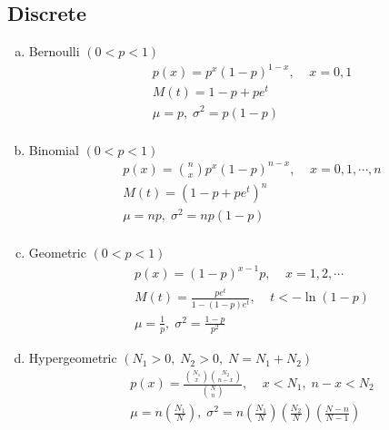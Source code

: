 \documentclass{article}
\begin{document}
    \subsection{Discrete}
        \begin{enumerate}[(a)]
            \item Bernoulli $(0 < p < 1)$
            $$
            \begin{aligned}
                & p(x) = p^x(1 - p)^{1 - x}, \;\;\;\; x = 0, 1 \\
                & M(t) = 1 - p + pe^t \\
                & \mu = p, \; \sigma^2 = p(1 - p) \\
            \end{aligned}
            $$
            
            \item Binomial $(0 < p < 1)$
            $$
            \begin{aligned}
                & p(x) = \binom{n}{x} p^x(1 - p)^{n - x}, \;\;\;\; x = 0, 1, \cdots, n \\
                & M(t) = (1 - p + pe^t )^n \\
                & \mu = np, \; \sigma^2 = np(1 - p) \\
            \end{aligned}
            $$
            
            \item Geometric $(0 < p < 1)$
            $$
            \begin{aligned}
                & p(x) = (1 - p)^{x - 1}p, \;\;\;\; x = 1, 2, \cdots \\
                & M(t) = \frac{pe^t}{1 - (1 - p)e^t}, \;\;\;\; t < -\ln{(1 - p)}\\
                & \mu = \frac{1}{p}, \; \sigma^2 = \frac{1 - p}{p^2}
            \end{aligned}
            $$

            \item Hypergeometric $(N_1 > 0, \; N_2 > 0, \; N = N_1 + N_2)$
            $$
            \begin{aligned}
                & p(x) = \frac{\binom{N_1}{x}\binom{N_2}{n - x}}{\binom{N}{n}}, \;\;\;\; x < N_1, \; n - x < N_2 \\
                & \mu = n\left(\frac{N_1}{N}\right), \; \sigma^2 = n\left(\frac{N_1}{N}\right)\left(\frac{N_2}{N}\right)\left(\frac{N - n}{N - 1}\right)
            \end{aligned}
            $$
            

\end{enumerate}
\end{document}
